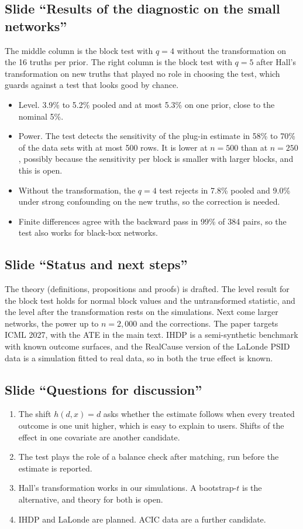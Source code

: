 \documentclass[10pt]{article}
\newcommand{\slide}[1]{\subsection*{Slide ``#1''}}
\begin{document}
\slide{Results of the diagnostic on the small networks}
The middle column is the block test with $q=4$ without the transformation on the 16 truths per prior. The right column
is the block test with $q=5$ after Hall's transformation on new truths that played no role in choosing the test, which
guards against a test that looks good by chance.
\begin{itemize}
\item Level. 3.9\% to 5.2\% pooled and at most 5.3\% on one prior, close to the nominal 5\%.
\item Power. The test detects the sensitivity of the plug-in estimate in 58\% to 70\% of the data sets with at most 500
rows. It is lower at $n=500$ than at $n=250$, possibly because the sensitivity per block is smaller with larger blocks,
and this is open.
\item Without the transformation, the $q=4$ test rejects in 7.8\% pooled and 9.0\% under strong confounding on the new
truths, so the correction is needed.
\item Finite differences agree with the backward pass in 99\% of 384 pairs, so the test also works for black-box
networks.
\end{itemize}

\slide{Status and next steps}
The theory (definitions, propositions and proofs) is drafted. The level result for the block test holds for normal block
values and the untransformed statistic, and the level after the transformation rests on the simulations. Next come
larger networks, the power up to $n=2{,}000$ and the corrections. The paper targets ICML 2027, with the ATE in the main
text. IHDP is a semi-synthetic benchmark with known outcome surfaces, and the RealCause version of the LaLonde PSID data
is a simulation fitted to real data, so in both the true effect is known.

\slide{Questions for discussion}
\begin{enumerate}
\item The shift $h(d,x)=d$ asks whether the estimate follows when every treated outcome is one unit higher, which is
easy to explain to users. Shifts of the effect in one covariate are another candidate.
\item The test plays the role of a balance check after matching, run before the estimate is reported.
\item Hall's transformation works in our simulations. A bootstrap-$t$ is the alternative, and theory for both is open.
\item IHDP and LaLonde are planned. ACIC data are a further candidate.
\end{enumerate}
\end{document}
